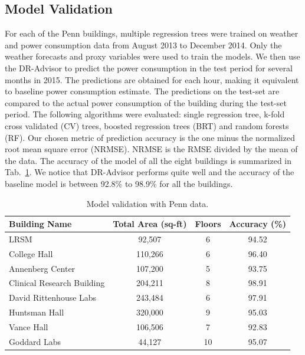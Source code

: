 \subsection{Model Validation}
For each of the Penn buildings, multiple regression trees were trained on weather and power consumption data from August 2013 to  December 2014. 
Only the weather forecasts and proxy variables were used to train the models.
We then use the DR-Advisor to predict the power consumption in the test period \ie for several months in 2015. 
The predictions are obtained for each hour, making it equivalent to baseline power consumption estimate. 
The predictions on the test-set are compared to the actual power consumption of the building during the test-set period. 
The following algorithms were evaluated: single regression tree, k-fold cross validated (CV) trees, boosted regression trees (BRT) and random forests (RF).
Our chosen metric of prediction accuracy is the one minus the normalized root mean square error (NRMSE). NRMSE is the RMSE divided by the mean of the data. The accuracy of the model of all the eight buildings is summarized in Tab.~\ref{tab:penn}. We notice that DR-Advisor performs quite well and the accuracy of the baseline model is between 92.8\% to 98.9\% for all the buildings.
\begin{table}
\centering
\caption{Model validation with Penn data.}
    \begin{tabular}{l|c|c|c}
    \toprule
    Building Name            & Total Area (sq-ft) & Floors & Accuracy (\%) \\
    \midrule
    LRSM                       & 92,507             & 6      & 94.52       \\
    College Hall               & 110,266            & 6      & 96.40       \\
    Annenberg Center           & 107,200            & 5      & 93.75       \\
    Clinical Research Building & 204,211            & 8      & 98.91       \\
    David Rittenhouse Labs     & 243,484            & 6      & 97.91       \\
    Huntsman Hall              & 320,000            & 9      & 95.03       \\
    Vance Hall                 & 106,506            & 7      & 92.83       \\
    Goddard Labs               & 44,127             & 10     & 95.07   \\
    \bottomrule
    \end{tabular}
 \label{tab:penn}   
\end{table}


